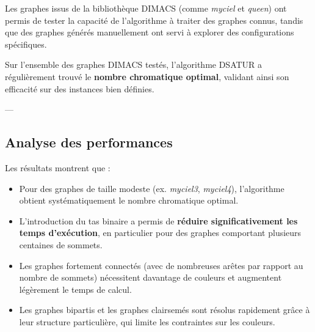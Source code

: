 \documentclass[11pt]{article}
\begin{document}
\begin{table}[h!]
    \centering
    \caption{Résultats des tests sur différents graphes}
    \label{tab:results}
\end{table}

Les graphes issus de la bibliothèque DIMACS (comme \textit{myciel} et \textit{queen}) ont permis de tester la capacité de l’algorithme à traiter des graphes connus, tandis que des graphes générés manuellement ont servi à explorer des configurations spécifiques.

Sur l’ensemble des graphes DIMACS testés, l’algorithme DSATUR a régulièrement trouvé le \textbf{nombre chromatique optimal}, validant ainsi son efficacité sur des instances bien définies.

---

\subsection{Analyse des performances}

Les résultats montrent que :
\begin{itemize}
    \item Pour des graphes de taille modeste (ex. \textit{myciel3}, \textit{myciel4}), l’algorithme obtient systématiquement le nombre chromatique optimal.
    \item L’introduction du tas binaire a permis de \textbf{réduire significativement les temps d’exécution}, en particulier pour des graphes comportant plusieurs centaines de sommets.
    \item Les graphes fortement connectés (avec de nombreuses arêtes par rapport au nombre de sommets) nécessitent davantage de couleurs et augmentent légèrement le temps de calcul.
    \item Les graphes bipartis et les graphes clairsemés sont résolus rapidement grâce à leur structure particulière, qui limite les contraintes sur les couleurs.
\end{itemize}
\end{document}
